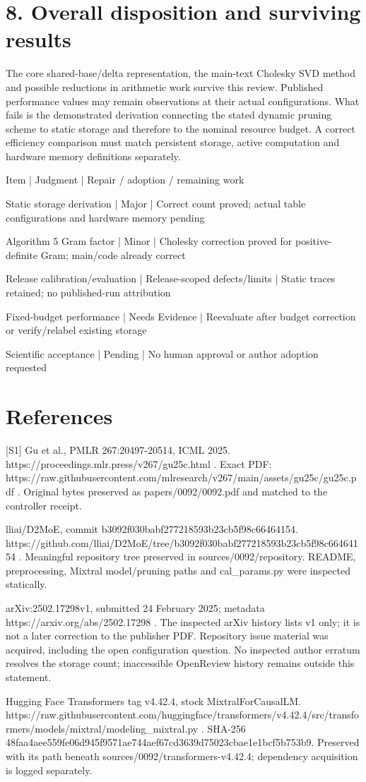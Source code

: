 \documentclass[10pt]{article}
\begin{document}
\section*{8. Overall disposition and surviving results}
The core shared-base/delta representation, the main-text Cholesky SVD method and possible reductions in arithmetic work survive this review. Published performance values may remain observations at their actual configurations. What fails is the demonstrated derivation connecting the stated dynamic pruning scheme to static storage and therefore to the nominal resource budget. A correct efficiency comparison must match persistent storage, active computation and hardware memory definitions separately.\par
Item | Judgment | Repair / adoption / remaining work\par
Static storage derivation | Major | Correct count proved; actual table configurations and hardware memory pending\par
Algorithm 5 Gram factor | Minor | Cholesky correction proved for positive-definite Gram; main/code already correct\par
Release calibration/evaluation | Release-scoped defects/limits | Static traces retained; no published-run attribution\par
Fixed-budget performance | Needs Evidence | Reevaluate after budget correction or verify/relabel existing storage\par
Scientific acceptance | Pending | No human approval or author adoption requested\par
\section*{References}
[S1] Gu et al., PMLR 267:20497-20514, ICML 2025. https://proceedings.mlr.press/v267/gu25c.html . Exact PDF: https://raw.githubusercontent.com/mlresearch/v267/main/assets/gu25c/gu25c.pdf . Original bytes preserved as papers/0092/0092.pdf and matched to the controller receipt.\par
[S2] lliai/D2MoE, commit b3092f030babf277218593b23cb5f98c66464154. https://github.com/lliai/D2MoE/tree/b3092f030babf277218593b23cb5f98c66464154 . Meaningful repository tree preserved in sources/0092/repository. README, preprocessing, Mixtral model/pruning paths and cal\_params.py were inspected statically.\par
[S3] arXiv:2502.17298v1, submitted 24 February 2025; metadata https://arxiv.org/abs/2502.17298 . The inspected arXiv history lists v1 only; it is not a later correction to the publisher PDF. Repository issue material was acquired, including the open configuration question. No inspected author erratum resolves the storage count; inaccessible OpenReview history remains outside this statement.\par
[S4] Hugging Face Transformers tag v4.42.4, stock MixtralForCausalLM. https://raw.githubusercontent.com/huggingface/transformers/v4.42.4/src/transformers/models/mixtral/modeling\_mixtral.py . SHA-256 48faa4aee559fe06d945f9571ae744aef67cd3639d75023cbae1e1bcf5b753b9. Preserved with its path beneath sources/0092/transformers-v4.42.4; dependency acquisition is logged separately.\par
\end{document}
